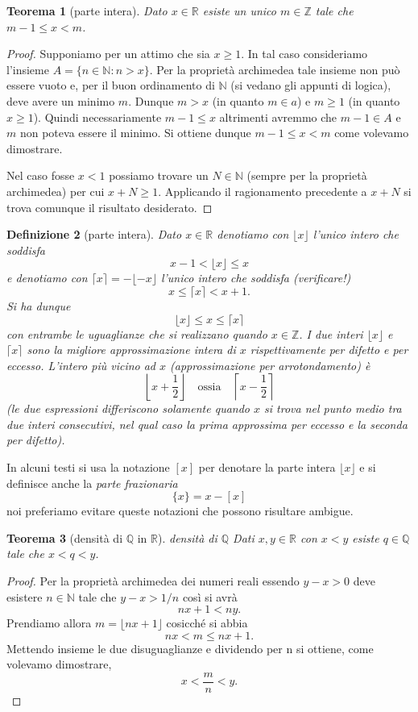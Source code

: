 \documentclass[italian,a4paper,oneside,headinclude]{scrbook}
\newcommand{\mymargin}[1]{\marginpar{#1}\index{#1}}
\newcommand{\NN}{\mathbb N}
\newcommand{\QQ}{\mathbb Q}
\newcommand{\RR}{\mathbb R}
\newcommand{\ZZ}{\mathbb Z}
\newtheorem{theorem}{Teorema}
\newtheorem{definition}[theorem]{Definizione}
\begin{document}
\begin{theorem}[parte intera]
Dato $x\in \RR$ esiste un unico $m\in \ZZ$ tale che $m-1 \le x < m$.
\end{theorem}
%
\begin{proof}
Supponiamo per un attimo che sia $x\ge 1$.
In tal caso consideriamo l'insieme $A=\{n\in \NN\colon n > x\}$.
Per la proprietà archimedea tale insieme non può essere vuoto e,
per il buon ordinamento di $\NN$ (si vedano gli appunti di logica),
deve avere un minimo $m$.
Dunque $m>x$ (in quanto $m\in a$) e $m\ge 1$ (in quanto $x\ge 1$).
Quindi necessariamente $m-1 \le x$ altrimenti avremmo che $m-1\in A$ e $m$
non poteva essere il minimo. Si ottiene dunque $m-1\le x < m$ come volevamo
dimostrare.

Nel caso fosse $x<1$ possiamo trovare un $N\in \NN$ (sempre per la proprietà archimedea) per cui $x+N \ge 1$. Applicando il ragionamento precedente a $x+N$ si trova comunque il risultato desiderato.
\end{proof}

\begin{definition}[parte intera]
\mymargin{parte intera}
Dato $x\in \RR$ denotiamo con $\lfloor x\rfloor$ l'unico intero
che soddisfa
\marginpar{$\lfloor\cdot\rfloor$} %
\[
  x - 1 < \lfloor x \rfloor \le x
\]
e denotiamo con $\lceil x \rceil = - \lfloor -x \rfloor$ l'unico intero che soddisfa (verificare!)
\marginpar{$\lceil\cdot\rceil$} %
\[
  x \le \lceil x \rceil < x + 1.
\]
Si ha dunque
\[
  \lfloor x \rfloor \le x \le \lceil x \rceil
\]
con entrambe le uguaglianze che si realizzano quando $x\in \ZZ$.
I due interi $\lfloor x \rfloor$ e $\lceil x \rceil$
sono la migliore approssimazione intera di $x$ rispettivamente
per difetto e per eccesso.
L'intero più vicino ad $x$ (approssimazione per arrotondamento)
è
\[
  \left\lfloor x + \frac 1 2 \right\rfloor
\quad \text{ossia} \quad
  \left\lceil x-\frac 1 2 \right\rceil
\]
(le due espressioni differiscono solamente quando $x$ si trova nel punto medio tra due interi consecutivi, nel qual caso la prima approssima per eccesso e la seconda per difetto).
\end{definition}
In alcuni testi si usa la notazione $[x]$ per denotare la parte intera $\lfloor x \rfloor$ e si definisce
anche la \emph{parte frazionaria}
\[
   \{x\} = x - [x]
\]
noi preferiamo evitare queste notazioni che possono risultare ambigue.

\begin{theorem}[densità di $\QQ$ in $\RR$]
\emph{densità di $\QQ$}
Dati $x,y \in \RR$ con $x<y$ esiste $q\in \QQ$ tale che $x<q<y$.
\end{theorem}
%
\begin{proof}
Per la proprietà archimedea dei numeri reali essendo $y-x>0$
deve esistere $n\in \NN$ tale che $y-x > 1/n$ così si avrà
\[
    nx + 1 < ny.
\]
Prendiamo allora $m=\lfloor nx + 1\rfloor$ cosicché si abbia
\[
  nx < m \le nx + 1.
\]
Mettendo insieme le due disuguaglianze e dividendo per n si ottiene,
come volevamo dimostrare,
\[
 x < \frac{m}{n} < y.
\]
\end{proof}
\end{document}
